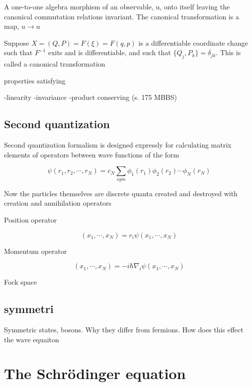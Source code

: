 A one-to-one algebra morphism of an observable, u, onto itself leaving the canonical commutation relations invariant. The canonical transformation is a map, $u \rightarrow u$ 

Suppose $X = (Q, P) = F(\xi) = F(q, p)$ is a differentiable coordinate change such that $F^{-1}$ exits and is differentiable, and such that $\{Q_j, P_k\} = \delta_{jk}$. This is called a canonical transformation

properties satisfying 

-linearity
-invariance
-product conserving (s. 175 MBBS)

\subsection{Second quantization}

Second quantization formalism is designed expressly for calculating matrix elements of operators between wave functions of the form 

\begin{equation}
\psi (r_1, r_2, \cdots, r_N) = c_N \sum_{sym} \phi_1(r_1) \phi_2(r_2) \cdots \phi_N(r_N)
\end{equation}

Now the particles themselves are discrete quanta created and destroyed with creation and annihilation operators

Position operator 

\begin{equation}
[\hat{r_i} \psi](x_1, \cdots, x_N) = r_i \psi (x_1, \cdots, x_N) 
\end{equation}

Momentum operator 

\begin{equation}
[\hat{p_i} \psi](x_1, \cdots, x_N) = -i \hbar \nabla_i \psi (x_1, \cdots, x_N) 
\end{equation}

Fock space

\subsection{symmetri}
Symmetric states, bosons. Why they differ from fermions.
How does this effect the wave equaiton

\section{The Schrödinger equation}

